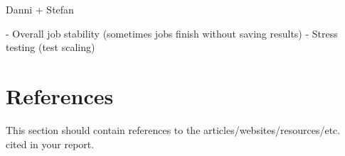 \documentclass[a4paper,12pt]{article}
\begin{document}
Danni + Stefan

- Overall job stability (sometimes jobs finish without saving results)
- Stress testing (test scaling)

\section{References}

This section should contain references to the articles/websites/resources/etc.
cited in your report.


    \label{lastpage} %
    \newpage
    \rfoot{} %

\printbibliography
    

\end{document}
